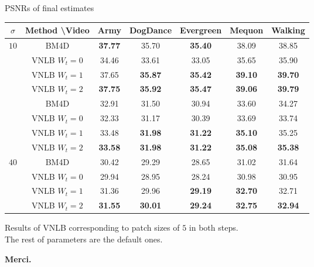 \documentclass[mathserif, 8pt]{beamer}
\makeatletter
\newcounter{multipleslide}
\newcommand{\restoreframe}{%
\patchcmd{\beamer@@tmpl@footline}%
	{\themultipleslide}%
	{\insertframenumber}%
	{}%
	{}%
\setcounter{framenumber}{\value{multipleslide}}%
}
\newcommand{\best}[1]{\textbf{\textcolor{MyOrange}{#1}}}
\makeatother
\begin{document}
\begin{frame}{PSNRs of final estimates}

	\begin{center}
	\begin{tabular}{| c | c |c c c c c|}
		\hline \hline
		$\sigma$  & Method \textbackslash Video & Army & DogDance & Evergreen & Mequon & Walking \\\hline\hline
		\multirow{5}{*}{$10$} & BM4D           & \best{37.77} &       35.70  & \best{35.40} &       38.09  &       38.85  \\%
		                      & VNLB $W_t = 0$ &       34.46  &       33.61  &       33.05  &       35.65  &       35.90  \\%
		                      & VNLB $W_t = 1$ &       37.65  & \best{35.87} & \best{35.42} & \best{39.10} & \best{39.70} \\%
									 & VNLB $W_t = 2$ & \best{37.75} & \best{35.92} & \best{35.47} & \best{39.06} & \best{39.79} \\\hline
%									 
		\multirow{5}{*}{$25$} & BM4D           &       32.91  &       31.50  &       30.94  &       33.60  &       34.27  \\%
		                      & VNLB $W_t = 0$ &       32.33  &       31.17  &       30.39  &       33.69  &       33.74  \\%
									 & VNLB $W_t = 1$ &       33.48  & \best{31.98} & \best{31.22} & \best{35.10} &       35.25  \\%
		                      & VNLB $W_t = 2$ & \best{33.58} & \best{31.98} & \best{31.22} & \best{35.08} & \best{35.38} \\\hline
%									 
		\multirow{5}{*}{$40$} & BM4D           &       30.42  &       29.29  &       28.65  &       31.02  &       31.64  \\%
		                      & VNLB $W_t = 0$ &       29.94  &       28.95  &       28.24  &       30.98  &       30.95  \\%
									 & VNLB $W_t = 1$ &       31.36  &       29.96  & \best{29.19} & \best{32.70} &       32.71  \\%
									 & VNLB $W_t = 2$ & \best{31.55} & \best{30.01} & \best{29.24} & \best{32.75} & \best{32.94} \\\hline\hline
	\end{tabular}

	\bigskip
	Results of VNLB corresponding to patch sizes of $5$ in both steps.\\The rest of parameters are the default ones.
	\end{center}

\end{frame}
\restoreframe

\begin{frame}{}
	\centering
   \vspace{1.7cm}
   \textcolor{MyOrange}{\textbf{\Huge{Merci.}}}\\
   \vspace{5cm}
\end{frame}



% 
% 
\end{document}
